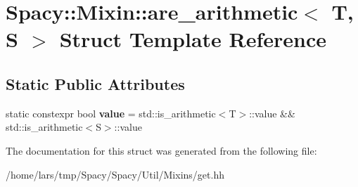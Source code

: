 \hypertarget{structSpacy_1_1Mixin_1_1are__arithmetic}{}\section{Spacy\+:\+:Mixin\+:\+:are\+\_\+arithmetic$<$ T, S $>$ Struct Template Reference}
\label{structSpacy_1_1Mixin_1_1are__arithmetic}
\subsection*{Static Public Attributes}
\begin{DoxyCompactItemize}
\item 
static constexpr bool {\bfseries value} = std\+::is\+\_\+arithmetic$<$T$>$\+::value \&\& std\+::is\+\_\+arithmetic$<$S$>$\+::value\hypertarget{structSpacy_1_1Mixin_1_1are__arithmetic_a0d64437a233e33664a5dea44cced21fa}{}\label{structSpacy_1_1Mixin_1_1are__arithmetic_a0d64437a233e33664a5dea44cced21fa}

\end{DoxyCompactItemize}


The documentation for this struct was generated from the following file\+:\begin{DoxyCompactItemize}
\item 
/home/lars/tmp/\+Spacy/\+Spacy/\+Util/\+Mixins/get.\+hh\end{DoxyCompactItemize}
